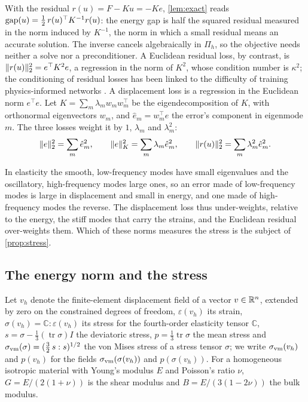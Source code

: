 \begin{remark}\label{rem:norms}
With the residual $r(u)=F-Ku=-Ke$, \cref{lem:exact} reads
$\operatorname{gap}(u)=\tfrac12\,r(u)^{\top}K^{-1}r(u)$: the energy gap is half the squared residual
measured in the norm induced by $K^{-1}$, the norm in which a small residual means an
accurate solution. The inverse cancels algebraically in $\Pi_h$, so the objective needs
neither a solve nor a preconditioner. A Euclidean residual loss, by contrast, is
$\lVert r(u)\rVert_2^2=e^{\top}K^{2}e$, a regression in the norm of $K^2$, whose condition number
is $\kappa^2$; the conditioning of residual losses has been linked to the difficulty of
training physics-informed networks \cite{WangYuPerdikaris2022,DeRyck2024}. A displacement
loss is a regression in the Euclidean norm $e^{\top}e$. Let $K=\sum_{m}\lambda_m
w_mw_m^{\top}$ be the eigendecomposition of $K$, with orthonormal eigenvectors $w_m$, and
$\hat e_m=w_m^{\top}e$ the error's component in eigenmode $m$. The three losses weight it by
$1$, $\lambda_m$ and $\lambda_m^2$:
\begin{equation}
\lVert e\rVert_2^2=\sum_m\hat e_m^2,\qquad
\lVert e\rVert_K^2=\sum_m\lambda_m\hat e_m^2,\qquad
\lVert r(u)\rVert_2^2=\sum_m\lambda_m^2\hat e_m^2 .
\label{eq:norms}
\end{equation}
\end{remark}

In elasticity the smooth, low-frequency modes have small eigenvalues and the oscillatory,
high-frequency modes large ones, so an error made of low-frequency modes is large in
displacement and small in energy, and one made of high-frequency modes the reverse. The
displacement loss thus under-weights, relative to the energy, the stiff modes that carry the
strains, and the Euclidean residual over-weights them. Which of these norms measures the
stress is the subject of \cref{prop:stress}.

\subsection{The energy norm and the stress}\label{sec:theory:stress}

Let $v_h$ denote the finite-element displacement field of a vector $v\in\mathbb{R}^n$, extended by
zero on the constrained degrees of freedom, $\varepsilon(v_h)$ its strain,
$\sigma(v_h)=\mathbb{C}:\varepsilon(v_h)$ its stress for the fourth-order elasticity
tensor $\mathbb{C}$, $s=\sigma-\tfrac13(\operatorname{tr}\sigma)I$ the deviatoric stress,
$p=\tfrac13\operatorname{tr}\sigma$ the mean stress and $\sigma_{\mathrm{vm}}(\sigma)=(\tfrac32\,s:s)^{1/2}$
the von Mises stress of a stress tensor $\sigma$; we write $\sigma_{\mathrm{vm}}(v_h)$ and $p(v_h)$ for the
fields $\sigma_{\mathrm{vm}}(\sigma(v_h))$ and $p(\sigma(v_h))$. For a homogeneous isotropic material with
Young's modulus $E$ and Poisson's ratio $\nu$, $G=E/(2(1+\nu))$ is the shear modulus and
$B=E/(3(1-2\nu))$ the bulk modulus.

